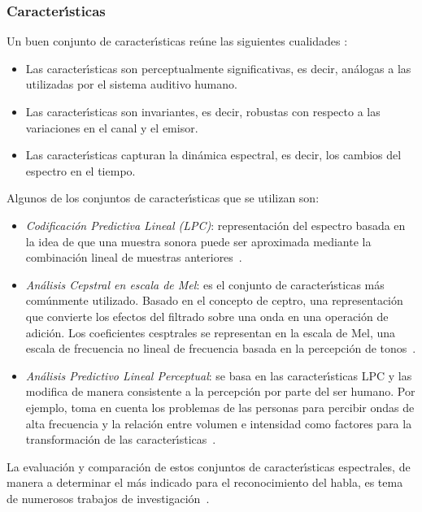 \subsubsection{Caracter{\'\i}sticas}
Un buen conjunto de caracter{\'\i}sticas re\'une las siguientes cualidades \cite{KesarkarFeature2003}:
\begin{itemize}
\item Las caracter{\'\i}sticas son perceptualmente significativas, es decir, an\'alogas a las utilizadas por el sistema auditivo humano.
\item Las caracter{\'\i}sticas son invariantes, es decir, robustas con respecto a las variaciones en el canal y el emisor.
\item Las caracter{\'\i}sticas capturan la din\'amica espectral, es decir, los cambios del espectro en el tiempo.
\end{itemize}

Algunos de los conjuntos de caracter{\'\i}sticas que se utilizan son:
\begin{itemize}
\item \emph{Codificaci\'on Predictiva Lineal (LPC)}: representaci\'on del espectro basada en la idea de que una muestra sonora puede ser 
aproximada mediante la combinaci\'on lineal de muestras \mbox{anteriores \cite{KesarkarFeature2003}}.
\item \emph{An\'alisis Cepstral en escala de Mel}: es el conjunto de caracter{\'\i}sticas m\'as com\'unmente utilizado. Basado en el concepto 
de ceptro, una representaci\'on que convierte los efectos del filtrado sobre una onda en una operaci\'on de adici\'on. Los coeficientes 
cesptrales se representan en la escala de Mel, una escala de frecuencia no lineal de frecuencia basada en la percepci\'on de 
\mbox{tonos \cite{Ellis08anintroduction}}.
\item \emph{An\'alisis Predictivo Lineal Perceptual}: se basa en las caracter{\'\i}sticas LPC y las modifica de manera consistente a la 
percepci\'on por parte del ser humano. Por ejemplo, toma en cuenta los problemas de las personas para percibir ondas de alta frecuencia y la 
relaci\'on entre volumen e intensidad como factores para la transformaci\'on de las \mbox{caracter{\'\i}sticas \cite{Jurafsky}}. 
\end{itemize}

La evaluaci\'on y comparaci\'on de estos conjuntos de caracter{\'\i}sticas espectrales, de manera a determinar el m\'as indicado para el 
reconocimiento del habla, es tema de numerosos trabajos de 
\mbox{investigaci\'on \cite{DorraComparative2006, SarosiComparison2011, ElminirEvaluation2012}}.